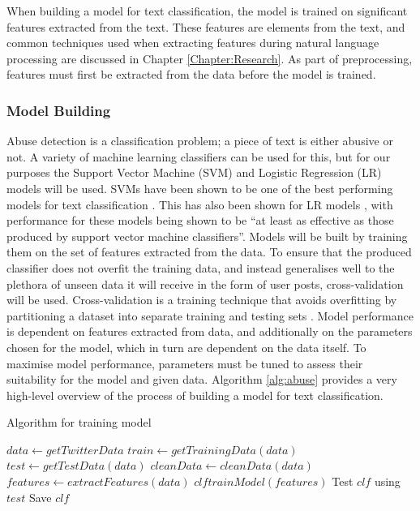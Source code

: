 When building a model for text classification, the model is trained on significant features extracted from the text. These features are elements from the text, and common techniques used when extracting features during natural language processing are discussed in Chapter \ref{Chapter:Research}. As part of preprocessing, features must first be extracted from the data before the model is trained.

\subsubsection{Model Building}
Abuse detection is a classification problem; a piece of text is either abusive or not. A variety of machine learning classifiers can be used for this, but for our purposes the Support Vector Machine (SVM) and Logistic Regression (LR) models will be used. SVMs have been shown to be one of the best performing models for text classification \cite{joachims1998text}. This has also been shown for LR models \cite{genkin2007large}, with performance for these models being shown to be ``at least as effective as those produced by support vector machine classifiers''. Models will be built by training them on the set of features extracted from the data. To ensure that the produced classifier does not overfit the training data, and instead generalises well to the plethora of unseen data it will receive in the form of user posts, cross-validation will be used. Cross-validation is a training technique that avoids overfitting by partitioning a dataset into separate training and testing sets \cite{scikit:cross-val}. Model performance is dependent on features extracted from data, and additionally on the parameters chosen for the model, which in turn are dependent on the data itself. To maximise model performance, parameters must be tuned to assess their suitability for the model and given data. Algorithm \ref{alg:abuse} provides a very high-level overview of the process of building a model for text classification.

\begin{algorithm}
\caption{Algorithm for training model}
\label{alg:abuse}
\begin{algorithmic}[1]
\State $data\gets getTwitterData$
\State $train\gets getTrainingData(data)$
\State $test\gets getTestData(data)$
\State $cleanData\gets cleanData(data)$
\State $features\gets extractFeatures(data)$
\State $clf trainModel(features)$
\State Test $clf$ using $test$
\State Save $clf$
\end{algorithmic}
\end{algorithm}

